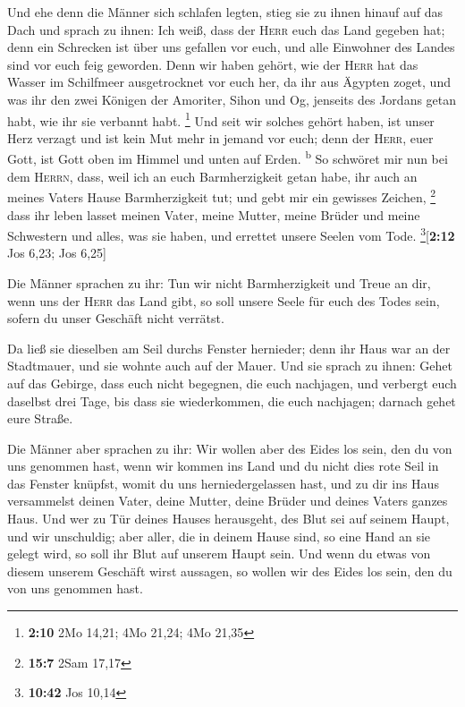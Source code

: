  Und ehe denn die Männer sich schlafen legten, stieg sie
zu ihnen hinauf auf das Dach  und sprach zu ihnen: Ich
weiß, dass der \textsc{Herr} euch das Land gegeben hat; denn ein
Schrecken ist über uns gefallen vor euch, und alle Einwohner des Landes
sind vor euch feig geworden.  Denn wir haben gehört, wie
der \textsc{Herr} hat das Wasser im Schilfmeer ausgetrocknet vor euch
her, da ihr aus Ägypten zoget, und was ihr den zwei Königen der
Amoriter, Sihon und Og, jenseits des Jordans getan habt, wie ihr sie
verbannt habt. \footnote{\textbf{2:10} 2Mo 14,21; 4Mo 21,24; 4Mo 21,35}
 Und seit wir solches gehört haben, ist unser Herz
verzagt und ist kein Mut mehr in jemand vor euch; denn der
\textsc{Herr}, euer Gott, ist Gott oben im Himmel und unten auf Erden.
\textsuperscript{b}  So schwöret mir nun bei dem
\textsc{Herrn}, dass, weil ich an euch Barmherzigkeit getan habe, ihr
auch an meines Vaters Hause Barmherzigkeit tut; und gebt mir ein
gewisses Zeichen, \footnote{\textbf{15:7} 2Sam 17,17} 
dass ihr leben lasset meinen Vater, meine Mutter, meine Brüder und meine
Schwestern und alles, was sie haben, und errettet unsere Seelen vom
Tode. \footnote{\textbf{10:42} Jos 10,14}{[}\textbf{2:12} Jos 6,23; Jos
6,25{]}

 Die Männer sprachen zu ihr: Tun wir nicht Barmherzigkeit
und Treue an dir, wenn uns der \textsc{Herr} das Land gibt, so soll
unsere Seele für euch des Todes sein, sofern du unser Geschäft nicht
verrätst.

 Da ließ sie dieselben am Seil durchs Fenster hernieder;
denn ihr Haus war an der Stadtmauer, und sie wohnte auch auf der Mauer.
 Und sie sprach zu ihnen: Gehet auf das Gebirge, dass
euch nicht begegnen, die euch nachjagen, und verbergt euch daselbst drei
Tage, bis dass sie wiederkommen, die euch nachjagen; darnach gehet eure
Straße.

 Die Männer aber sprachen zu ihr: Wir wollen aber des
Eides los sein, den du von uns genommen hast,  wenn wir
kommen ins Land und du nicht dies rote Seil in das Fenster knüpfst,
womit du uns herniedergelassen hast, und zu dir ins Haus versammelst
deinen Vater, deine Mutter, deine Brüder und deines Vaters ganzes Haus.
 Und wer zu Tür deines Hauses herausgeht, des Blut sei
auf seinem Haupt, und wir unschuldig; aber aller, die in deinem Hause
sind, so eine Hand an sie gelegt wird, so soll ihr Blut auf unserem
Haupt sein.  Und wenn du etwas von diesem unserem
Geschäft wirst aussagen, so wollen wir des Eides los sein, den du von
uns genommen hast.

